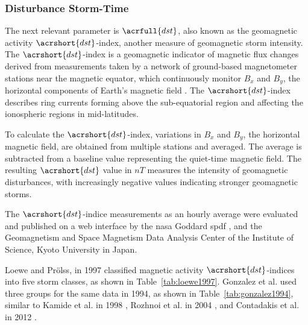 \documentclass[sn-mathphys-num]{sn-jnl}%
\begin{document}
\subsubsection{Disturbance Storm-Time}

The next relevant parameter is $\acrfull{dst}$, also known as the geomagnetic activity $\acrshort{dst}$-index, another measure of geomagnetic storm intensity. The $\acrshort{dst}$-index is a geomagnetic indicator of magnetic flux changes derived from measurements taken by a network of ground-based magnetometer stations near the magnetic equator, which continuously monitor $B_{x}$ and $B_{y}$, the horizontal components of Earth's magnetic field \cite{zolesi2014ionospheric}. The $\acrshort{dst}$-index describes ring currents forming above the sub-equatorial region and affecting the ionospheric regions in mid-latitudes.

To calculate the $\acrshort{dst}$-index, variations in $B_{x}$ and $B_{y}$, the horizontal magnetic field, are obtained from multiple stations and averaged. The average is subtracted from a baseline value representing the quiet-time magnetic field. The resulting $\acrshort{dst}$ value in $nT$ measures the intensity of geomagnetic disturbances, with increasingly negative values indicating stronger geomagnetic storms. 

The $\acrshort{dst}$-indice measurements as an hourly average were evaluated and published on a web interface by the \acrshort{nasa} Goddard \acrshort{spdf} \cite{Papitashvili2024About, Papitashvili2024Explorer}, and the Geomagnetism and Space Magnetism Data Analysis Center of the Institute of Science, Kyoto University in Japan.

Loewe and Prölss, in 1997 \cite{loewe1997classification} classified magnetic activity $\acrshort{dst}$-indices into five storm classes, as shown in Table~\ref{tab:loewe1997}. Gonzalez et al. \cite{gonzalez1994geomagnetic} used three groups for the same data in 1994, as shown in Table~\ref{tab:gonzalez1994}, similar to Kamide et al. in 1998 \cite{kamide1998two}, Rozhnoi et al. in 2004 \cite{rozhnoi2004middle}, and Contadakis et al. in 2012 \cite{contadakis2012total}.
\end{document}
